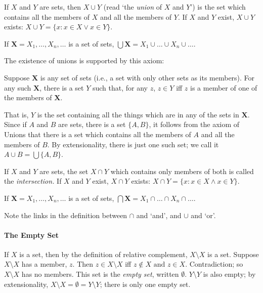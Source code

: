 \begin{definition}[Union] If $X$ and $Y$ are sets, then $X \cup Y$
    (read `the {\em union} of $X$ and $Y$') is the set which contains 
    all the
    members of $X$ and all the members of $Y$. If $X$ and $Y$ exist, $X\cup Y$ exists: $X \cup Y = \{x:x\in X \vee x \in Y\}$. 

If $\mathbf{X}=X_{1},\ldots,X_{n},\ldots$ is a set of sets, $\bigcup \mathbf{X} = X_{1} \cup \ldots \cup X_{n} \cup \ldots$.
\end{definition}
The existence of unions is supported by this axiom: \begin{axiom}[Unions]
  Suppose $\mathbf{X}$ is any set of sets (i.e., a set with only other sets as its members). For any such $\mathbf{X}$, there is a set $Y$ such that, for any $z$, $z\in Y$ iff $z$ is a member of one of the members of $\mathbf{X}$.  
\end{axiom} That is, $Y$ is the set containing all the things which are in any of the sets in $\mathbf{X}$. Since if $A$ and $B$ are sets, there is a set $\{A,B\}$, it follows from the axiom of Unions that there is a set which contains all the members of $A$ and all the members of $B$. By extensionality, there is just one such set; we call it $A \cup B = \bigcup\{A,B\}$.


\begin{definition}[Intersection] If $X$ and $Y$ are sets, the set $X
    \cap Y$ which contains only members of both is called the {\em
    intersection.} If $X$ and $Y$ exist, $X \cap Y$ exists: $X\cap Y = \{x:x\in X \wedge x\in Y\}$.

If $\mathbf{X}=X_{1},\ldots,X_{n},\ldots$ is a set of sets, $\bigcap \mathbf{X} = X_{1} \cap \ldots \cap X_{n} \cap \ldots$.
\end{definition}
Note the links in the definition between $\cap$ and `and', and $\cup$ and `or'.
 

\paragraph{The Empty Set}

If $X$ is a set, then by the definition of relative complement, $X\setminus X$ is a set. Suppose $X\setminus X$ has a member, $z$.  Then 	$z\in X\setminus X$ iff $z \notin X \text{ and } z \in X$. Contradiction; so $X\setminus X$ has no members. This set is the \emph{empty set}, written $\emptyset$. $Y\setminus Y$ is also empty; by extensionality, $X\setminus X=\emptyset=Y\setminus Y$; there is only one empty set.

